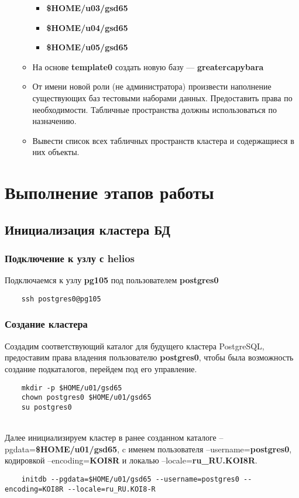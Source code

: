 \documentclass{article}
\begin{document}
\begin{enumerate}
\begin{itemize}
                    \begin{itemize}
                        \item \textbf{\$HOME/u03/gsd65}
                        \item \textbf{\$HOME/u04/gsd65}
                        \item \textbf{\$HOME/u05/gsd65}
                    \end{itemize}
                \item На основе \textbf{template0} создать новую базу — \textbf{greatercapybara}
            \item От имени новой роли (не администратора) произвести наполнение
существующих баз тестовыми наборами данных. Предоставить права по
необходимости. Табличные пространства должны использоваться по назначению.
            \item Вывести список всех табличных пространств кластера и содержащиеся
в них объекты.
          \end{itemize}
\end{enumerate}

\section{Выполнение этапов работы}

\subsection{Инициализация кластера БД}

\subsubsection{Подключение к узлу с helios}
Подключаемся к узлу \textbf{pg105} под пользователем \textbf{postgres0}
\begin{verbatim}
    ssh postgres0@pg105
\end{verbatim}

\subsubsection{Создание кластера}
Создадим соответствующий каталог для будущего кластера PostgreSQL, предоставим права владения пользователю \textbf{postgres0}, чтобы была возможность создание подкаталогов, перейдем под его управление.
\begin{verbatim}
    mkdir -p $HOME/u01/gsd65
    chown postgres0 $HOME/u01/gsd65
    su postgres0
\end{verbatim}
\\
Далее инициализируем кластер в ранее созданном каталоге --pgdata=\textbf{\$HOME/u01/gsd65}, c именем пользователя --username=\textbf{postgres0}, кодировкой --encoding=\textbf{KOI8R} и локалью --locale=\textbf{ru\_RU.KOI8\-R}.
\begin{verbatim}
    initdb --pgdata=$HOME/u01/gsd65 --username=postgres0 --encoding=KOI8R --locale=ru_RU.KOI8-R
\end{verbatim}
\end{document}
